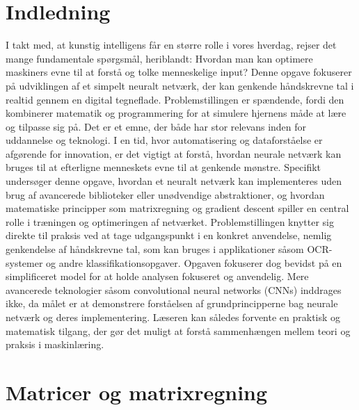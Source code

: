 \documentclass{article}
\begin{document}
\tableofcontents
\newpage
{} 

\section{Indledning}
I takt med, at kunstig intelligens får en større rolle i vores hverdag, rejser det mange fundamentale spørgsmål, heriblandt: Hvordan man kan optimere maskiners evne til at forstå og tolke menneskelige input? Denne opgave fokuserer på udviklingen af et simpelt neuralt netværk, der kan genkende håndskrevne tal i realtid gennem en digital tegneflade. Problemstillingen er spændende, fordi den kombinerer matematik og programmering for at simulere hjernens måde at lære og tilpasse sig på. Det er et emne, der både har stor relevans inden for uddannelse og teknologi. I en tid, hvor automatisering og dataforståelse er afgørende for innovation, er det vigtigt at forstå, hvordan neurale netværk kan bruges til at efterligne menneskets evne til at genkende mønstre. Specifikt undersøger denne opgave, hvordan et neuralt netværk kan implementeres uden brug af avancerede biblioteker eller unødvendige abstraktioner, og hvordan matematiske principper som matrixregning og gradient descent spiller en central rolle i træningen og optimeringen af netværket. Problemstillingen knytter sig direkte til praksis ved at tage udgangspunkt i en konkret anvendelse, nemlig genkendelse af håndskrevne tal, som kan bruges i applikationer såsom OCR-systemer og andre klassifikationsopgaver. Opgaven fokuserer dog bevidst på en simplificeret model for at holde analysen fokuseret og anvendelig. Mere avancerede teknologier såsom convolutional neural networks (CNNs) inddrages ikke, da målet er at demonstrere forståelsen af grundprincipperne bag neurale netværk og deres implementering. Læseren kan således forvente en praktisk og matematisk tilgang, der gør det muligt at forstå sammenhængen mellem teori og praksis i maskinlæring.

\newpage
\section{Matricer og matrixregning}
\end{document}
